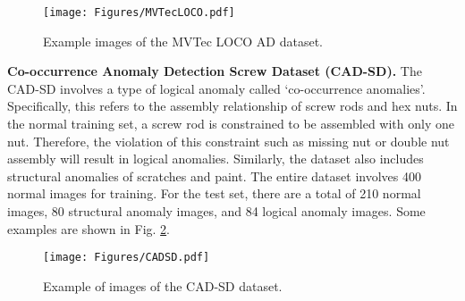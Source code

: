\documentclass[final,5p,times,twocolumn]{elsarticle}
\begin{document}
\begin{figure}
\centering
		\texttt{[image: Figures/MVTecLOCO.pdf]}\caption{Example images of the MVTec LOCO AD dataset.}
	\label{FIG:7}
\end{figure}

\textbf{Co-occurrence Anomaly Detection Screw Dataset (CAD-SD).} The CAD-SD \cite{ishida2023sa} involves a type of logical anomaly called `co-occurrence anomalies'. Specifically, this refers to the assembly relationship of screw rods and hex nuts. In the normal training set, a screw rod is constrained to be assembled with only one nut. Therefore, the violation of this constraint such as missing nut or double nut assembly will result in logical anomalies. Similarly, the dataset also includes structural anomalies of scratches and paint. The entire dataset involves 400 normal images for training. For the test set, there are a total of 210 normal images, 80 structural anomaly images, and 84 logical anomaly images. Some examples are shown in Fig. \ref{FIG:8}.

\begin{figure}
\centering
		\texttt{[image: Figures/CADSD.pdf]}\caption{Example of images of the CAD-SD dataset.}
	\label{FIG:8}
\end{figure}
\end{document}
